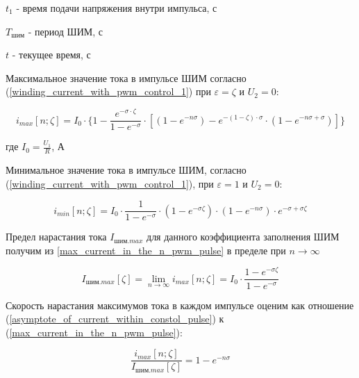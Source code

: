 $t_{1}$ - время подачи напряжения внутри импульса, с

$T_\text{шим}$ - период ШИМ, с

$t$ - текущее время, с
\newline

Максимальное значение тока в импульсе ШИМ согласно (\ref{winding_current_with_pwm_control_1}) при
$\varepsilon = \zeta$ и $U_{2} = 0$:

\begin{equation}
    \label{max_current_in_the_n_pwm_pulse}
    i_{max}[n; \zeta] =
        I_{0}
            \cdot \{ 1
                     - \frac{ e^{-\sigma \cdot \zeta} }{ 1 - e^{-\sigma} }
                       \cdot [ (1 - e^{-n\sigma})
                               - e^{ -(1 - \zeta) \cdot \sigma }
                                    \cdot ( 1 - e^{-n\sigma + \sigma} )
                             ]
                  \}
\end{equation}

где $I_{0} = \frac{ U_{1} }{ R }$, А

Минимальное значение тока в импульсе ШИМ, согласно (\ref{winding_current_with_pwm_control_1}), при
$\varepsilon = 1$ и $U_{2} = 0$:

\begin{equation}
    \label{min_current_in_the_n_pwm_pulse}
    i_{min}[n; \zeta] =
        I_{0}
            \cdot \frac{ 1 }{ 1-e^{-\sigma} }
            \cdot (1 - e^{-\sigma\zeta})
            \cdot (1 - e^{-n\sigma})
            \cdot e^{-\sigma + \sigma\zeta}
\end{equation}

Предел нарастания тока $I_{\text{шим}.max}$ для данного коэффициента заполнения ШИМ получим из
\ref{max_current_in_the_n_pwm_pulse} в пределе при $n \to \infty$

\begin{equation}
    \label{asymptote_of_current_within_constol_pulse}
    I_{\text{шим}.max}[\zeta]=
        \lim_{n \to \infty} i_{max} [n; \zeta] =
            I_{0} \cdot \frac{ 1 - e^{-\sigma\zeta} }{ 1 - e^{-\sigma}}
\end{equation}

Скорость нарастания максимумов тока в каждом импульсе оценим как отношение
(\ref{asymptote_of_current_within_constol_pulse}) к (\ref{max_current_in_the_n_pwm_pulse}):

\begin{equation}
    \label{ current_grow_estimate }
    \frac{ i_{max}[n; \zeta] }{ I_{\text{шим}.max}[\zeta] } = 1 - e^{-n \sigma}
\end{equation}

